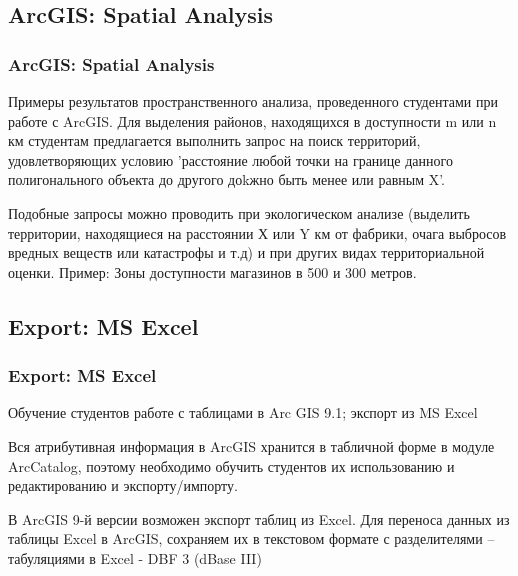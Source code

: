 \documentclass[pdflatex,compress,8pt,
	xcolor={dvipsnames,dvipsnames,svgnames,x11names,table},
	hyperref={	 
	pdfauthor={Lemenkova Polina}, 
	pdfsubject={Preentation}, 
	pdfcreator={Lemenkova Polina}, 
	pdfproducer={Lemenkova Polina}, 
	colorlinks=true,
	linkcolor=Red3, 
	citecolor=NavyBlue, 
	urlcolor = NavyBlue, 
	breaklinks = true}]{beamer}
\begin{document}
\subsection{ArcGIS: Spatial Analysis}
\begin{frame}\frametitle{ArcGIS: Spatial Analysis}

\begin{alertblock}{}
Примеры результатов пространственного анализа, проведенного студентами при работе с ArcGIS. Для выделения районов, находящихся в доступности m или n км студентам предлагается выполнить запрос на поиск территорий, удовлетворяющих условию 'расстояние любой точки на границе данного полигонального объекта до другого доkжно быть менее или равным X'. 
\end{alertblock}

\begin{figure}[H]
	\centering
			\hspace{1mm}
\end{figure}

\begin{block}{}
Подобные запросы можно проводить при экологическом анализе (выделить территории, находящиеся на расстоянии Х или Y км от фабрики, очага выбросов вредных веществ или катастрофы и т.д) и при других видах 
территориальной оценки. Пример: Зоны доступности магазинов в 500 и 300 метров.
\end{block}

\end{frame}

\subsection{Export: MS Excel}
\begin{frame}\frametitle{Export: MS Excel}
Обучение студентов работе с таблицами в Arc GIS 9.1; экспорт из MS Excel
	
\begin{alertblock}{}
Вся атрибутивная информация в ArcGIS хранится в табличной форме в модуле ArcCatalog,
поэтому необходимо обучить студентов их использованию и редактированию и экспорту/импорту.
\end{alertblock}

\begin{figure}[H]
	\centering
			\hspace{1mm}
\end{figure}

\begin{block}{}
В ArcGIS 9-й версии возможен экспорт таблиц из Excel. Для переноса данных из таблицы Excel в ArcGIS, сохраняем их в текстовом формате с разделителями – табуляциями в Excel -  DBF 3 (dBase III) 
\end{block}

\end{frame}
\end{document}
